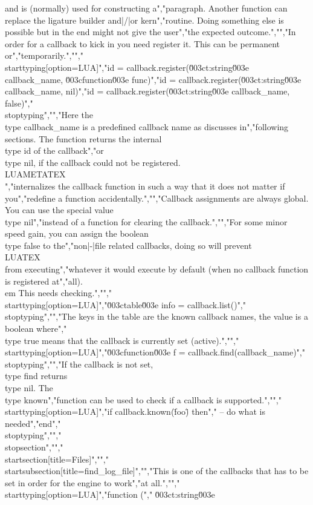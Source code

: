 and is (normally) used for constructing a","paragraph. Another function can replace the ligature builder and|/|or kern","routine. Doing something else is possible but in the end might not give the user","the expected outcome.","","In order for a callback to kick in you need register it. This can be permanent or","temporarily.","","\\starttyping[option=LUA]","id = callback.register(\u003ct:string\u003e callback_name, \u003cfunction\u003e func)","id = callback.register(\u003ct:string\u003e callback_name, nil)","id = callback.register(\u003ct:string\u003e callback_name, false)","\\stoptyping","","Here the \\type {callback_name} is a predefined callback name as discusses in","following sections. The function returns the internal \\type {id} of the callback","or \\type {nil}, if the callback could not be registered. \\LUAMETATEX\\","internalizes the callback function in such a way that it does not matter if you","redefine a function accidentally.","","Callback assignments are always global. You can use the special value \\type {nil}","instead of a function for clearing the callback.","","For some minor speed gain, you can assign the boolean \\type {false} to the","non|-|file related callbacks, doing so will prevent \\LUATEX\\ from executing","whatever it would execute by default (when no callback function is registered at","all). {\\em This needs checking.}","","\\starttyping[option=LUA]","\u003ctable\u003e info = callback.list()","\\stoptyping","","The keys in the table are the known callback names, the value is a boolean where","\\type {true} means that the callback is currently set (active).","","\\starttyping[option=LUA]","\u003cfunction\u003e f = callback.find(callback_name)","\\stoptyping","","If the callback is not set, \\type {find} returns \\type {nil}. The \\type {known}","function can be used to check if a callback is supported.","","\\starttyping[option=LUA]","if callback.known(\"foo\") then","    -- do what is needed","end","\\stoptyping","","\\stopsection","","\\startsection[title=Files]","","\\startsubsection[title=find_log_file]","","This is one of the callbacks that has to be set in order for the engine to work","at all.","","\\starttyping[option=LUA]","function (","    \u003ct:string\u003e 
